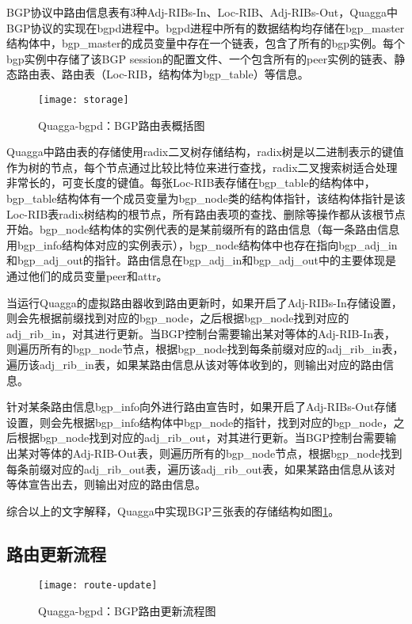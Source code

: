 BGP协议中路由信息表有3种Adj-RIBs-In、Loc-RIB、Adj-RIBs-Out，Quagga中BGP协议的实现在bgpd进程中。bgpd进程中所有的数据结构均存储在bgp\_master结构体中，bgp\_master的成员变量中存在一个链表，包含了所有的bgp实例。每个bgp实例中存储了该BGP session的配置文件、一个包含所有的peer实例的链表、静态路由表、路由表（Loc-RIB，结构体为bgp\_table）等信息。


\begin{figure}
  \centering
  \texttt{[image: storage]}
  \caption{Quagga-bgpd：BGP路由表概括图\cite{jakma2014quagga}}
  \label{fig:storage}
\end{figure}

Quagga中路由表的存储使用radix二叉树\cite{quaggaThesis}存储结构，radix树是以二进制表示的键值作为树的节点，每个节点通过比较比特位来进行查找，radix二叉搜索树适合处理非常长的，可变长度的键值。每张Loc-RIB表存储在bgp\_table的结构体中，bgp\_table结构体有一个成员变量为bgp\_node类的结构体指针，该结构体指针是该Loc-RIB表radix树结构的根节点，所有路由表项的查找、删除等操作都从该根节点开始。bgp\_node结构体的实例代表的是某前缀所有的路由信息（每一条路由信息用bgp\_info结构体对应的实例表示），bgp\_node结构体中也存在指向bgp\_adj\_in和bgp\_adj\_out的指针。路由信息在bgp\_adj\_in和bgp\_adj\_out中的主要体现是通过他们的成员变量peer和attr。

当运行Quagga的虚拟路由器收到路由更新时，如果开启了Adj-RIBs-In存储设置，则会先根据前缀找到对应的bgp\_node，之后根据bgp\_node找到对应的adj\_rib\_in，对其进行更新。当BGP控制台需要输出某对等体的Adj-RIB-In表，则遍历所有的bgp\_node节点，根据bgp\_node找到每条前缀对应的adj\_rib\_in表，遍历该adj\_rib\_in表，如果某路由信息从该对等体收到的，则输出对应的路由信息。

针对某条路由信息bgp\_info向外进行路由宣告时，如果开启了Adj-RIBs-Out存储设置，则会先根据bgp\_info结构体中bgp\_node的指针，找到对应的bgp\_node，之后根据bgp\_node找到对应的adj\_rib\_out，对其进行更新。当BGP控制台需要输出某对等体的Adj-RIB-Out表，则遍历所有的bgp\_node节点，根据bgp\_node找到每条前缀对应的adj\_rib\_out表，遍历该adj\_rib\_out表，如果某路由信息从该对等体宣告出去，则输出对应的路由信息。

综合以上的文字解释，Quagga中实现BGP三张表的存储结构如图\ref{fig:storage}。
\subsection{路由更新流程}

\begin{figure}
  \centering
  \texttt{[image: route-update]}
  \caption{Quagga-bgpd：BGP路由更新流程图}
  \label{fig:route-update}
\end{figure}



